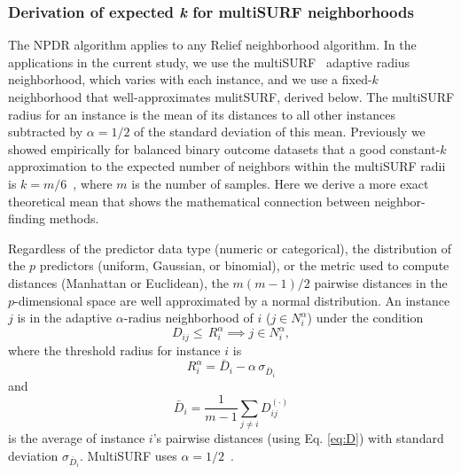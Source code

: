 \documentclass[10pt]{article}
\begin{document}

\subsubsection{Derivation of expected \textit{k} for multiSURF neighborhoods}
The NPDR algorithm applies to any Relief neighborhood algorithm. In the applications in the current study, we use the multiSURF~\cite{urbanowicz17} adaptive radius neighborhood, which varies with each instance, and we use a fixed-$k$ neighborhood that well-approximates mulitSURF, derived below. The multiSURF radius for an instance is the mean of its distances to all other instances subtracted by $\alpha=1/2$ of the standard deviation of this mean. Previously we showed empirically for balanced binary outcome datasets that a good constant-$k$ approximation to the expected number of neighbors within the multiSURF radii is $k=m/6$~\cite{stir}, where $m$ is the number of samples. Here we derive a more exact theoretical mean that shows the mathematical connection between neighbor-finding methods.

Regardless of the predictor data type (numeric or categorical), the distribution of the $p$ predictors (uniform, Gaussian, or binomial), or the metric used to compute distances (Manhattan or Euclidean), the $m(m-1)/2$ pairwise distances in the $p$-dimensional space are well approximated by a normal distribution. An instance $j$ is in the adaptive $\alpha$-radius neighborhood of $i$ ($j \in N^{\alpha}_{i}$) under the condition
%
%
\begin{equation}
D_{ij} \le \, R_i^{\alpha} \implies j \in N^{\alpha}_{i},
\end{equation}
where the threshold radius for instance $i$ is
\begin{equation} 
R_i^{\alpha} =  \bar{D}_i - \alpha \, \sigma_{\bar{D}_i}
\end{equation}
and 
\begin{equation}
\bar{D}_i = \frac{1}{m-1} \sum_{j \ne i} D^{(\cdot)}_{ij}
\end{equation}
is the average of instance $i$'s pairwise distances (using Eq. \ref{eq:D}) with standard deviation $\sigma_{\bar{D}_i}$. MultiSURF uses $\alpha=1/2$~\cite{msurf13}. 
 
\end{document}
